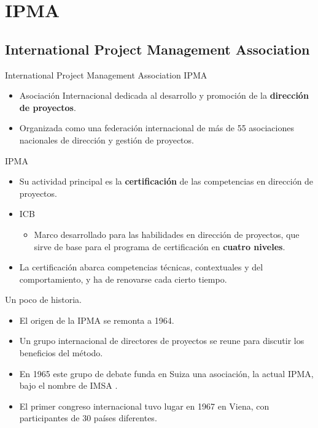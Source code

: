 \section{IPMA}

\subsection{International Project Management Association}
\begin{frame}[allowframebreaks]{International Project Management Association}
	IPMA 
	\begin{itemize}
		\item Asociación Internacional dedicada al desarrollo y promoción de la \textbf{dirección de proyectos}.
		\item Organizada como una federación internacional de más de 55 asociaciones nacionales de dirección y gestión de proyectos.
	\end{itemize}
	
	\framebreak
	
	IPMA 
	
	\begin{itemize}
		\item Su actividad principal es la \textbf{certificación} de las competencias en dirección de proyectos.
		\item ICB 
		\begin{itemize}
				\item Marco desarrollado para las habilidades en dirección de proyectos, que sirve de base para el programa de certificación en \textbf{cuatro niveles}.
		\end{itemize}
		\item La certificación abarca competencias técnicas, contextuales y del comportamiento, y ha de renovarse cada cierto tiempo.
	\end{itemize}
	
	\framebreak
	
	Un poco de historia.
	
	\begin{itemize}
		\item El origen de la IPMA se remonta a 1964.
		\item Un grupo internacional de directores de proyectos se reune para discutir los beneficios del método.
		\item En 1965 este grupo de debate funda en Suiza una asociación, la actual IPMA, bajo el nombre de IMSA .
		\item El primer congreso internacional tuvo lugar en 1967 en Viena, con participantes de 30 países diferentes.
	\end{itemize}
	

\end{frame}
